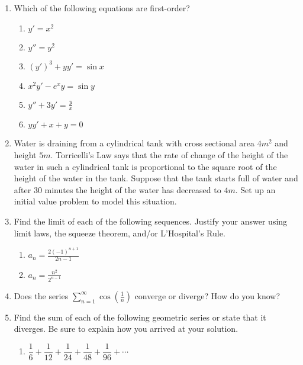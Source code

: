 \documentclass{nosvagor-notes}
\begin{document}
\begin{enumerate}
  \item Which of the following equations are first-order?
    \begin{multicols}{2}
      \begin{enumerate}
        \item \(y' = x^2 \)
        \item \(y'' = y^2\)
        \item \((y')^3 + yy' = \sin x\)
        \item \(x^2y' - e^xy = \sin y\)
        \item \(y'' + 3y' = \frac{y}{x}\)
        \item \(yy' + x + y = 0\)
      \end{enumerate}
    \end{multicols}

  \newpage

  \item Water is draining from a cylindrical tank with cross sectional area
  \(4m^2\) and height \(5m\). Torricelli’s  Law says that the rate of change of the
  height of the water in such a cylindrical tank is proportional to the square
  root of the height of the water in the tank. Suppose that the tank starts
  full of water and after 30 minutes the height of the water has decreased to
  \(4m\). Set up an initial value problem to model this situation.

  \newpage

  \item Find the limit of each of the following sequences. Justify your answer
    using limit laws, the squeeze theorem, and/or L’Hospital’s Rule.
    \begin{enumerate}
      \item \(\displaystyle a_n = \frac{2(-1)^{n+1}}{2n-1}\)
      \vspace{300pt}

      \item \(\displaystyle a_n = \frac{n^2}{2^{n-1}}\)
    \end{enumerate}

  \newpage

  \item Does the series \(\displaystyle \sum_{n=1}^{\infty} \cos \left(
    \frac{1}{n} \right) \) converge or diverge? How do you know?
    \vspace{160pt}

  \item Find the sum of each of the following geometric series or state that it
    diverges. Be sure to explain how you arrived at your solution.
    \begin{enumerate}
      \item \(\dfrac{1}{6} + \dfrac{1}{12} + \dfrac{1}{24} + \dfrac{1}{48} + \dfrac{1}{96} + \cdots\)
      \vspace{200pt}


\end{enumerate}
\end{enumerate}
\end{document}
